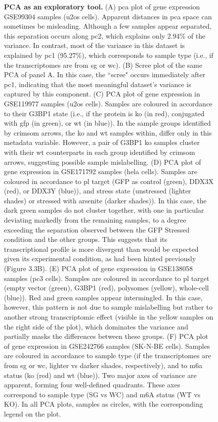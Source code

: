 \begin{figure}[t]
	\captionsetup{labelformat=adja-page}
	\ContinuedFloat
	\caption[]{\textbf{PCA as an exploratory tool.} (A) \gls{pca} plot of gene expression GSE99304\cite{khong_stress_2017} samples (\gls{u2os} cells). Apparent distances in \gls{pca} space can sometimes be misleading. Although a few samples appear separated, this separation occurs along \gls{pc}2, which explains only 2.94\% of the variance. In contrast, most of the variance in this dataset is explained by \gls{pc}1 (95.27\%), which corresponds to sample type (i.e., if the transcriptomes are from \gls{sg} or \gls{wc}). (B) Scree plot of the same PCA of panel A. In this case, the ``scree" occurs immediately after \gls{pc}1, indicating that the most meaningful dataset's variance is captured by this component. (C) PCA plot of gene expression in  GSE119977\cite{matheny_rna_2021} samples (\gls{u2os} cells). Samples are coloured in accordance to their G3BP1 state (i.e., if the protein is \gls{ko} (in red), conjugated with \gls{gfp} (in green), or \gls{wt} (in blue)\cite{matheny_rna_2021}). In the sample groups identified by crimsom arrows, the \gls{ko} and \gls{wt} samples within, differ only in this metadata variable. However, a pair of G3BP1 \gls{ko} samples cluster with their \gls{wt} counterparts in each group identified by crimsom arrows, suggesting possible sample mislabelling\protect\footnotemark. (D) PCA plot of gene expression in GSE171792\cite{shen_sexually_2022} samples (\gls{hela} cells). Samples are coloured in accordance to \gls{pl} target (GFP as control (green), DDX3X (red), or DDX3Y (blue)), and stress state (unstressed (lighter shades) or stressed with arsenite (darker shades)). In this case, the dark green samples do not cluster together, with one in particular deviating markedly from the remaining samples, to a degree exceeding the separation observed between the GFP Stressed condition and the other groups. This suggests that its transcriptional profile is more divergent than would be expected given its experimental condition, as had been hinted previously (Figure 3.3B). (E) PCA plot of gene expression in GSE138058\cite{somasekharan_g3bp1-linked_2020} samples (\gls{pc3} cells). Samples are coloured in accordance to \gls{pl} target (empty vector (green), G3BP1 (red), polysomes (yellow), whole-cell (blue)).  Red and green samples appear intermingled. In this case, however, this pattern is not due to sample mislabelling but rather to another strong transcriptomic effect (visible in the yellow samples on the right side of the plot), which dominates the variance and partially masks the differences between these groups. (F) PCA plot of gene expression in GSE242766\cite{di_timoteo_m6a_2024} samples (SK-N-BE cells). Samples are coloured in accordance to sample type (if the transcriptomes are from \gls{sg} or \gls{wc}, lighter \gls{vs} darker shades, respectively), and to \gls{m6a} status (\gls{ko} (red) and \gls{wt} (blue)). Two major axes of variance are apparent, forming four well-defined quadrants. These axes correspond to sample type (SG vs WC) and m6A status (WT vs KO). In all PCA plots, samples as circles, with the corresponding legend on the plot.}
\end{figure}

